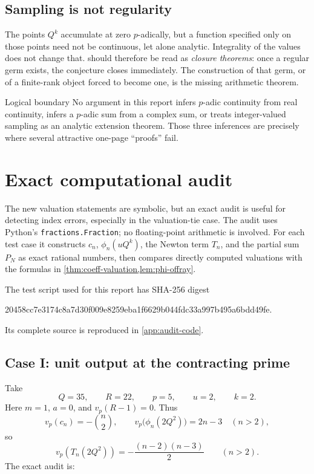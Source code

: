 \documentclass[11pt,oneside]{article}
\theoremstyle{definition}
\newcommand{\vp}{v_p}
\begin{document}
\subsection{Sampling is not regularity}

The points $Q^k$ accumulate at zero $p$-adically, but a function specified only on those
points need not be continuous, let alone analytic.  Integrality of the values does not change
that.   should therefore be read as
\emph{closure theorems}: once a regular germ exists, the conjecture closes immediately.  The
construction of that germ, or of a finite-rank object forced to become one, is the missing
arithmetic theorem.

\begin{warningbox}{Logical boundary}
No argument in this report infers $p$-adic continuity from real continuity, infers a $p$-adic
sum from a complex sum, or treats integer-valued sampling as an analytic extension theorem.
Those three inferences are precisely where several attractive one-page ``proofs'' fail.
\end{warningbox}

\section{Exact computational audit}
\label{sec:computational-audit}

The new valuation statements are symbolic, but an exact audit is useful for detecting index
errors, especially in the valuation-tie case.  The audit uses Python's
\texttt{fractions.Fraction}; no floating-point arithmetic is involved.  For each test case it
constructs $c_n$, $\phi_n(uQ^k)$, the Newton term $T_n$, and the partial sum $P_N$ as exact
rational numbers, then compares directly computed valuations with the formulas in
\cref{thm:coeff-valuation,lem:phi-offray}.

The test script used for this report has SHA-256 digest
\begin{center}
\ttfamily\small
20458cc7e3174c8a7d30f009e8259eba1f6629b044fdc33a997b495a6bdd49fe.
\end{center}
Its complete source is reproduced in \cref{app:audit-code}.

\subsection{Case I: unit output at the contracting prime}

Take
\[
 Q=35,\qquad R=22,\qquad p=5,\qquad u=2,\qquad k=2.
\]
Here $m=1$, $a=0$, and $\vp(R-1)=0$.  Thus
\[
 \vp(c_n)=-\binom n2,
 \qquad
 \vp\bigl(\phi_n(2Q^2)\bigr)=2n-3\quad(n>2),
\]
so
\begin{equation}\label{eq:case1-term}
 \vp(T_n(2Q^2))=-\frac{(n-2)(n-3)}2
 \qquad(n>2).
\end{equation}
The exact audit is:
\end{document}
